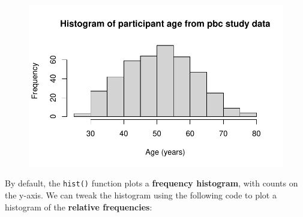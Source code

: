 \documentclass[
  a4paper,
]{memoir}
\newenvironment{Shaded}{\begin{snugshade}}{\end{snugshade}}
\newcommand{\AttributeTok}[1]{\textcolor[rgb]{0.00,0.00,0.00}{#1}}
\newcommand{\ConstantTok}[1]{\textcolor[rgb]{0.00,0.00,0.00}{#1}}
\newcommand{\DecValTok}[1]{\textcolor[rgb]{0.00,0.00,0.00}{#1}}
\newcommand{\FunctionTok}[1]{\textcolor[rgb]{0.00,0.00,0.00}{#1}}
\newcommand{\NormalTok}[1]{\textcolor[rgb]{0.00,0.00,0.00}{#1}}
\newcommand{\OtherTok}[1]{\textcolor[rgb]{0.00,0.00,0.00}{#1}}
\newcommand{\SpecialCharTok}[1]{\textcolor[rgb]{0.00,0.00,0.00}{#1}}
\newcommand{\StringTok}[1]{\textcolor[rgb]{0.00,0.00,0.00}{#1}}
\begin{document}
\begin{figure}[H]

{\centering \includegraphics{01-intro_files/figure-pdf/unnamed-chunk-93-1.pdf}

}

\end{figure}

By default, the \texttt{hist()} function plots a \textbf{frequency
histogram}, with counts on the y-axis. We can tweak the histogram using
the following code to plot a histogram of the \textbf{relative
frequencies}:

\begin{Shaded}
\end{Shaded}
\end{document}
